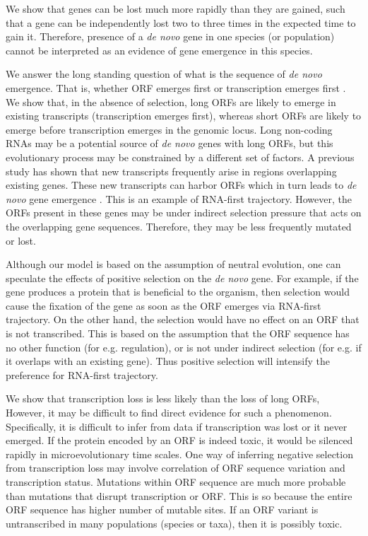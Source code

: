 \documentclass[12pt,a4paper]{article}
\begin{document}
We show that genes can be lost much more rapidly than they are gained, such that a gene can be independently lost two to three times in the expected time to gain it. Therefore, presence of a \textit{de novo} gene in one species (or population) cannot be interpreted as an evidence of gene emergence in this species.

We answer the long standing question of what is the sequence of \textit{de novo} emergence. That is, whether ORF emerges first or transcription emerges first \citep{EBB-F1000}. We show that, in the absence of selection, long ORFs are likely to emerge in existing transcripts (transcription emerges first), whereas short ORFs are likely to emerge before transcription emerges in the genomic locus. Long non-coding RNAs may be a potential source of \textit{de novo} genes with long ORFs, but this evolutionary process may be constrained by a different set of factors. A previous study has shown that new transcripts frequently arise in regions overlapping existing genes. These new transcripts can harbor ORFs which in turn leads to \textit{de novo} gene emergence \citep{albaYeastdenovo}. This is an example of RNA-first trajectory. However, the ORFs present in these genes may be under indirect selection pressure that acts on the overlapping gene sequences. Therefore, they may be less frequently mutated or lost.

Although our model is based on the assumption of neutral evolution, one can speculate the effects of positive selection on the \textit{de novo} gene. For example, if the gene produces a protein that is beneficial to the organism, then selection would cause the fixation of the gene as soon as the ORF emerges via RNA-first trajectory. On the other hand, the selection would have no effect on an ORF that is not transcribed. This is based on the assumption that the ORF sequence has no other function (for e.g. regulation), or is not under indirect selection (for e.g. if it overlaps with an existing gene). Thus positive selection will intensify the preference for RNA-first trajectory.

We show that transcription loss is less likely than the loss of long ORFs, However, it may be difficult to find direct evidence for such a phenomenon. Specifically, it is difficult to infer from data if transcription was lost or it never emerged. If the protein encoded by an ORF is indeed toxic, it would be silenced rapidly in microevolutionary time scales. One way of inferring negative selection from transcription loss may involve correlation of ORF sequence variation and transcription status. Mutations within ORF sequence are much more probable than mutations that disrupt transcription or ORF. This is so because the entire ORF sequence has higher number of mutable sites. If an ORF variant is untranscribed in many populations (species or taxa), then it is possibly toxic.  
\end{document}
